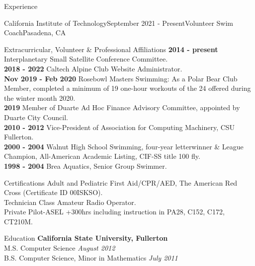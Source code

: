 \documentclass{resume} %
\begin{document}
\begin{rSection}{Experience}
\begin{rSubsection}{California Institute of Technology}{September 2021 - Present}{Volunteer Swim Coach}{Pasadena, CA}
\begin{rSection}{ Extracurricular, Volunteer \& Professional Affiliations}
{\bf 2014 - present} Interplanetary Small Satellite Conference Committee.\\
{\bf 2018 - 2022} Caltech Alpine Club Website Administrator.\\
{\bf Nov 2019 - Feb 2020} Rosebowl Masters Swimming: As a Polar Bear Club Member, completed a minimum of 19 one-hour workouts of the 24 offered during the winter month 2020. \\
{\bf 2019} Member of Duarte Ad Hoc Finance Advisory Committee, appointed by Duarte City Council. \\
{\bf 2010 - 2012} Vice-President of Association for Computing Machinery, CSU Fullerton.\\
{\bf 2000 - 2004} Walnut High School Swimming, four-year letterwinner \& League Champion, All-American Academic Listing, CIF-SS title 100 fly. \\
{\bf 1998 - 2004} Brea Aquatics, Senior Group Swimmer.
 

\end{rSection}




\begin{rSection}{Certifications}
{\bf } Adult and Pediatric First Aid/CPR/AED, The American Red Cross (Certificate ID 00ISKSO).\\
{\bf } Technician Class Amateur Radio Operator. \\
{\bf } Private Pilot-ASEL +300hrs including instruction in PA28, C152, C172, CT210M.\\

\end{rSection}


\begin{rSection}{Education}
{\bf California State University, Fullerton}  \\ 
M.S. Computer Science \hfill {\em August 2012}\\
B.S. Computer Science, Minor in Mathematics  \hfill {\em July 2011}\\
\end{rSection}



\end{rSubsection}
\end{rSection}
\end{document}
